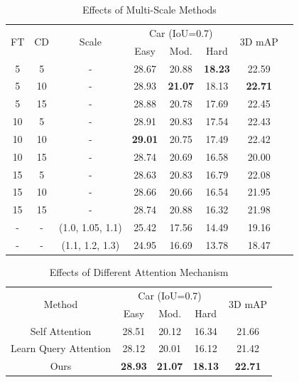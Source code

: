 \documentclass[journal]{IEEEtran}
\begin{document}
	\begin{table}[]
		\centering
		\setlength{\tabcolsep}{1mm}
		\caption{Effects of Multi-Scale Methods}
		\label{tab:multi scale}
		{%
			\begin{tabular}{cccccccc}
				\hline
				\multirow{2}{*}{{FT}}  & \multirow{2}{*}{CD} & \multirow{2}{*}{Scale} & \multicolumn{3}{c}{{Car (IoU=0.7)}} & \multirow{2}{*}{3D mAP} \\ \cmidrule{4-6} & & & Easy  & Mod.  & Hard  &       \\ \hline
				5		&5		&-						& 28.67 & 20.88 & \textbf{18.23} & 22.59 	\\
				5		&10		&-						& {28.93} & \textbf{21.07} 		&{18.13} & \textbf{22.71}	\\
				5		&15		&-						& 28.88 & 20.78 & 17.69 & 22.45 	\\
				10		&5		&-						& 28.91 & 20.83 & 17.54 & 22.43 	\\
				10		&10		&-						& \textbf{29.01} & 20.75 & 17.49 & 22.42 	\\
				10		&15		&-						& 28.74 & 20.69 & 16.58 & 20.00 	\\
				15		&5		&-						& 28.63 & 20.83 & 16.79 & 22.08 	\\
				15		&10		&-						& 28.66 & 20.66 & 16.54 & 21.95 	\\
				15		&15		&-						& 28.74 & 20.88 & 16.32 & 21.98 	\\ 
				-		&-		&(1.0, 1.05, 1.1)		& 25.42 & 17.56 & 14.49 & 19.16 	\\ 
				-		&-		&(1.1, 1.2, 1.3)		& 24.95 & 16.69 & 13.78 & 18.47 	\\ \hline
			\end{tabular}%
		}
	\end{table}
	
	\begin{table}[]
		\centering
		\caption{Effects of Different Attention Mechanism}
		\label{tab:attention mechanism}
		{%
			\begin{tabular}{ccccc}
				\hline
				\multirow{2}{*}{{Method}} & \multicolumn{3}{c}{{Car (IoU=0.7)}} & \multirow{2}{*}{3D mAP} \\ \cmidrule{2-4}
				& Easy  & Mod.  & Hard  &       \\ \hline
				Self Attention 		& {28.51} & {20.12} 		&{16.34} & {21.66} 	\\
				Learn Query Attention 	& 28.12 & 20.01 & 16.12 & 21.42 	\\
				Ours 			&  \textbf{28.93} & \textbf{21.07} 		&\textbf{18.13} & \textbf{22.71} 	 	\\\hline
			
			\end{tabular}%
		}
	\end{table}
	
\end{document}
